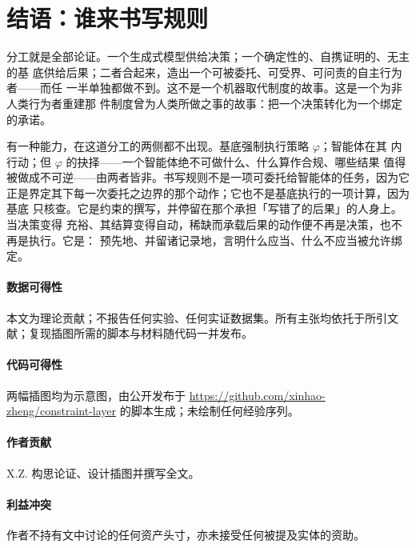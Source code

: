 \documentclass[11pt,UTF8]{ctexart}
\begin{document}
\section{结语：谁来书写规则}
\label{sec:coda}

分工就是全部论证。一个生成式模型供给决策；一个确定性的、自携证明的、无主的基
底供给后果；二者合起来，造出一个可被委托、可受界、可问责的自主行为者——而任
一半单独都做不到。这不是一个机器取代制度的故事。这是一个为非人类行为者重建那
件制度曾为人类所做之事的故事：把一个决策转化为一个绑定的承诺。

有一种能力，在这道分工的两侧都不出现。基底强制执行策略 $\varphi$；智能体在其
内行动；但 $\varphi$ 的抉择——一个智能体绝不可做什么、什么算作合规、哪些结果
值得被做成不可逆——由两者皆非。书写规则不是一项可委托给智能体的任务，因为它
正是界定其下每一次委托之边界的那个动作；它也不是基底执行的一项计算，因为基底
只核查。它是约束的撰写，并停留在那个承担「写错了的后果」的人身上。当决策变得
充裕、其结算变得自动，稀缺而承载后果的动作便不再是决策，也不再是执行。它是：
预先地、并留诸记录地，言明什么应当、什么不应当被允许绑定。

\paragraph*{数据可得性}
本文为理论贡献；不报告任何实验、任何实证数据集。所有主张均依托于所引文献；复现插图所需的脚本与材料随代码一并发布。

\paragraph*{代码可得性}
两幅插图均为示意图，由公开发布于 \url{https://github.com/xinhao-zheng/constraint-layer}
的脚本生成；未绘制任何经验序列。

\paragraph*{作者贡献}
X.Z. 构思论证、设计插图并撰写全文。

\paragraph*{利益冲突}
作者不持有文中讨论的任何资产头寸，亦未接受任何被提及实体的资助。
\end{document}
